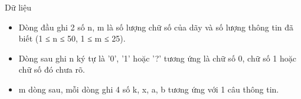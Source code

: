 Dữ liệu
\begin{itemize}
	\item Dòng đầu ghi 2 số n, m là số lượng chữ số của dãy và số lượng thông tin đã biết (1 ≤ n ≤ 50, 1 ≤ m ≤ 25).
	\item Dòng sau ghi n ký tự là '0', '1' hoặc '?' tương ứng là chữ số 0, chữ số 1 hoặc chữ số đó chưa rõ.
	\item m dòng sau, mỗi dòng ghi 4 số k, x, a, b tương ứng với 1 câu thông tin.
\end{itemize}